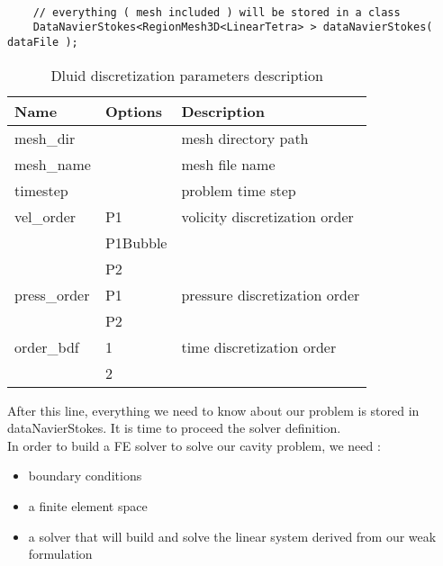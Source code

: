\begin{verbatim}

    // everything ( mesh included ) will be stored in a class
    DataNavierStokes<RegionMesh3D<LinearTetra> > dataNavierStokes( dataFile );

\end{verbatim}

\begin{table}
\begin{center}
\begin{tabular}{|l|l|l|}
\hline
Name & Options & Description \\
\hline \hline
mesh\_dir & & mesh directory path \\ \hline
mesh\_name & & mesh file name \\ \hline
timestep & & problem time step \\ \hline
vel\_order & P1 & volicity discretization order \\ \
& P1Bubble & \\
& P2 & \\ \hline
press\_order & P1 & pressure discretization order \\
& P2 & \\ \hline
order\_bdf & 1 & time discretization order \\
& 2 & \\ \hline
\end{tabular}
\end{center}
\caption{ Dluid discretization parameters description
}
\label{table-bcparams}
\end{table}


\noident After this line, everything we need to know about our problem is stored
in dataNavierStokes. It is time to proceed the solver definition. \\

In order to build a FE solver to solve our cavity problem, we need :
\begin{itemize}
\item boundary conditions
\item a finite element space
\item a solver that will build and solve the linear system derived from our weak formulation
\end{itemize}



